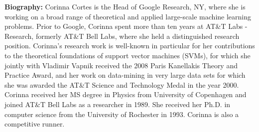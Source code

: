 \vspace{3em}\par 

\vfill
\noindent

{\bfseries Biography:} Corinna Cortes is the Head of Google Research,
NY, where she is working on a broad range of theoretical and applied
large-scale machine learning problems. Prior to Google, Corinna spent
more than ten years at AT\&T Labs - Research, formerly AT\&T Bell Labs,
where she held a distinguished research position. Corinna's research
work is well-known in particular for her contributions to the
theoretical foundations of support vector machines (SVMs), for which
she jointly with Vladimir Vapnik received the 2008 Paris Kanellakis
Theory and Practice Award, and her work on data-mining in very large
data sets for which she was awarded the AT\&T Science and Technology
Medal in the year 2000. Corinna received her MS degree in Physics from
University of Copenhagen and joined AT\&T Bell Labs as a researcher in
1989. She received her Ph.D. in computer science from the University
of Rochester in 1993. Corinna is also a competitive runner.

\newpage
